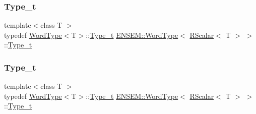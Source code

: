 \subsubsection{\texorpdfstring{Type\_t}{Type\_t}\hspace{0.1cm}{\footnotesize\ttfamily [1/3]}}
{\footnotesize\ttfamily template$<$class T $>$ \\
typedef \mbox{\hyperlink{structENSEM_1_1WordType}{Word\+Type}}$<$T$>$\+::\mbox{\hyperlink{structENSEM_1_1WordType_3_01RScalar_3_01T_01_4_01_4_a348d1b21435dcb68c291fefa3ae5c20c}{Type\+\_\+t}} \mbox{\hyperlink{structENSEM_1_1WordType}{E\+N\+S\+E\+M\+::\+Word\+Type}}$<$ \mbox{\hyperlink{classENSEM_1_1RScalar}{R\+Scalar}}$<$ T $>$ $>$\+::\mbox{\hyperlink{structENSEM_1_1WordType_3_01RScalar_3_01T_01_4_01_4_a348d1b21435dcb68c291fefa3ae5c20c}{Type\+\_\+t}}}

\mbox{\label{structENSEM_1_1WordType_3_01RScalar_3_01T_01_4_01_4_a348d1b21435dcb68c291fefa3ae5c20c}} 
\subsubsection{\texorpdfstring{Type\_t}{Type\_t}\hspace{0.1cm}{\footnotesize\ttfamily [2/3]}}
{\footnotesize\ttfamily template$<$class T $>$ \\
typedef \mbox{\hyperlink{structENSEM_1_1WordType}{Word\+Type}}$<$T$>$\+::\mbox{\hyperlink{structENSEM_1_1WordType_3_01RScalar_3_01T_01_4_01_4_a348d1b21435dcb68c291fefa3ae5c20c}{Type\+\_\+t}} \mbox{\hyperlink{structENSEM_1_1WordType}{E\+N\+S\+E\+M\+::\+Word\+Type}}$<$ \mbox{\hyperlink{classENSEM_1_1RScalar}{R\+Scalar}}$<$ T $>$ $>$\+::\mbox{\hyperlink{structENSEM_1_1WordType_3_01RScalar_3_01T_01_4_01_4_a348d1b21435dcb68c291fefa3ae5c20c}{Type\+\_\+t}}}

\mbox{\label{structENSEM_1_1WordType_3_01RScalar_3_01T_01_4_01_4_a348d1b21435dcb68c291fefa3ae5c20c}} 

